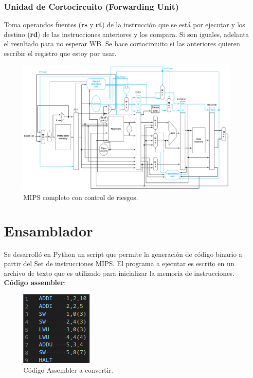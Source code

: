 \documentclass[12pt,A4paper,titlepage]{article}
\begin{document}
\subsubsection{Unidad de Cortocircuito (Forwarding Unit)}
Toma operandos fuentes (\textbf{rs} y \textbf{rt}) de la instrucción que se está por ejecutar y los destino (\textbf{rd}) de las instrucciones anteriores y los compara. Si son iguales, adelanta el resultado para no esperar WB. Se hace cortocircuito si las anteriores quieren escribir el registro que estoy por usar.


\begin{figure} [H]
    \centering
    \includegraphics[width=\textwidth]{figure/figure466-mips-finalv2.png}
    \caption{MIPS completo con control de riesgos.}
    \label{fig:mips-complete-control-de-riesgos}
\end{figure}

\section{Ensamblador}
Se desarrolló en Python un script que permite la generación de código binario a partir del Set de instrucciones MIPS. El programa a ejecutar es escrito en un archivo de texto que es utilizado para inicializar la memoria de instrucciones. \\
\textbf{Código assembler}:


\begin{figure}[H]
    \centering
    \includegraphics[scale=1.0]{figure/Codigo-Asm.png}
    \caption{Código Assembler a convertir.}
    \label{fig:my_label}
\end{figure}
\end{document}
